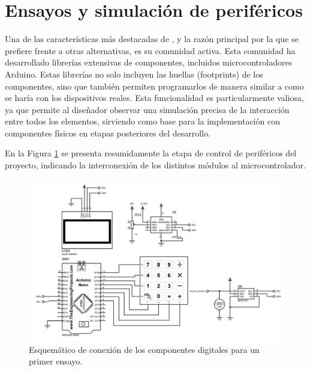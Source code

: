 \section{Ensayos y simulación de periféricos}
Una de las características más destacadas de , y la razón principal por la que se prefiere frente a otras alternativas, es su comunidad activa. Esta comunidad ha desarrollado librerías extensivas de componentes, incluidos microcontroladores Arduino. Estas librerías no solo incluyen las huellas (footprints) de los componentes, sino que también permiten programarlos de manera similar a como se haría con los dispositivos reales. Esta funcionalidad es particularmente valiosa, ya que permite al diseñador observar una simulación precisa de la interacción entre todos los elementos, sirviendo como base para la implementación con componentes físicos en etapas posteriores del desarrollo.\par

En la Figura \ref{F:esquematico_proteus} se presenta resumidamente la etapa de control de periféricos del proyecto, indicando la interconexión de los distintos módulos al microcontrolador.\par
\begin{figure}[H]
    \centering
    \includegraphics[width=\textwidth]{./imagenes/proteus_esquema2.jpg}
    \caption{Esquemático de conexión de los componentes digitales para un primer ensayo.}
    \label{F:esquematico_proteus}
\end{figure}

